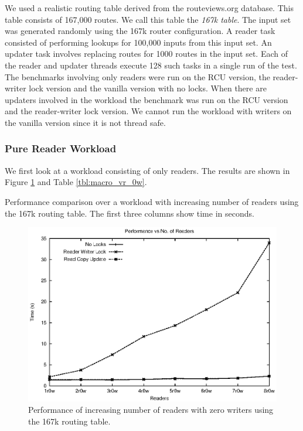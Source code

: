 \documentclass[12pt,a4paper]{article}
\begin{document}
We used a realistic routing table derived from the routeviews.org
database. This table consists of 167,000 routes. We call this table
the \emph{167k table}. The input set was generated randomly using the
167k router configuration. A reader task consisted of performing
lookups for 100,000 inputs from this input set. An updater task
involves replacing routes for 1000 routes in the input set. Each of
the reader and updater threads execute 128 such tasks in a single run
of the test.\\

The benchmarks involving only readers were run on the RCU version,
the reader-writer lock version and the vanilla version with no
locks. When there are updaters involved in the workload the benchmark
was run on the RCU version and the reader-writer lock version. We
cannot run the workload with writers on the vanilla version since it
is not thread safe.

\subsubsection{Pure Reader Workload}
 We first look at a workload consisting of only readers. The results
 are shown in Figure \ref{img:macro_vr_0w} and Table
 \ref{tbl:macro_vr_0w}.

\begin{table}[tph]
\begin{center}

\end{center}
\caption{Performance comparison over a workload with increasing number of readers using the 167k routing table. The first three columns show time in seconds.}
\label{tbl:macro_vr_0w}
\end{table}

\begin{figure}[tph]
\includegraphics[scale = 0.7]{../images/graphs/macro_vr_0w}
\caption{Performance of increasing number of readers with zero writers using the 167k routing table.}
\label{img:macro_vr_0w}
\end{figure}
\end{document}
